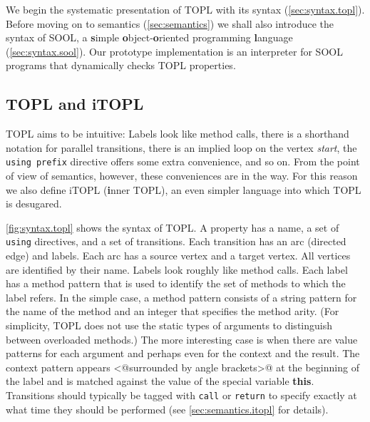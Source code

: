 \documentclass[preprint]{sigplanconf} %
\theoremstyle{definition}
\theoremstyle{remark}
\begin{document}
We begin the systematic presentation of TOPL with its syntax (\autoref{sec:syntax.topl}).
Before moving on to semantics (\autoref{sec:semantics}) we shall also introduce the syntax of SOOL, a \textbf simple \textbf object-\textbf oriented programming \textbf language (\autoref{sec:syntax.sool}).
Our prototype implementation is an interpreter for SOOL programs that dynamically checks TOPL properties.

\subsection{TOPL and iTOPL}\label{sec:syntax.topl} %


TOPL aims to be intuitive:
Labels look like method calls, there is a shorthand notation for parallel transitions, there is an implied loop on the vertex \textit{start}, the \texttt{using prefix} directive offers some extra convenience, and so on.
From the point of view of semantics, however, these conveniences are in the way.
For this reason we also define iTOPL (\textbf inner TOPL), an even simpler language into which TOPL is desugared.

\autoref{fig:syntax.topl} shows the syntax of TOPL\null.
A property has a name, a set of \texttt{using} directives, and a set of transitions.
Each transition has an arc (directed edge) and labels.
Each arc has a source vertex and a target vertex.
All vertices are identified by their name.
Labels look roughly like method calls.
Each label has a method pattern that is used to identify the set of methods to which the label refers.
In the simple case, a method pattern consists of a string pattern for the name of the method and an integer that specifies the method arity.
(For simplicity, TOPL does not use the static types of arguments to distinguish between overloaded methods.)
The more interesting case is when there are value patterns for each argument and perhaps even for the context and the result.
The context pattern appears \Verb@<@surrounded by angle brackets\Verb@>@ at the beginning of the label and is matched against the value of the special variable \textbf{this}.
Transitions should typically be tagged with \texttt{call} or \texttt{return} to specify exactly at what time they should be performed (see \autoref{sec:semantics.itopl} for details).
\end{document}
